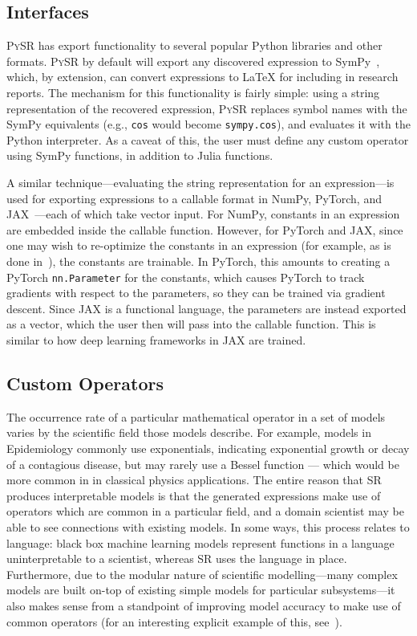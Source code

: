 \documentclass[letterpaper,twocolumn]{scrartcl}
\newcommand\pysr{\textsc{PySR}\xspace}
\begin{document}
\begin{linenumbers}
\subsection{Interfaces}
\label{sec:interfaces}

\pysr has export functionality to several popular Python libraries and other formats.
\pysr by default will export any discovered expression to SymPy~\cite{sympy}, which, by extension, can convert expressions to LaTeX for including in research reports.
The mechanism for this functionality is fairly simple: using a string representation of the recovered expression, \pysr replaces symbol names with the SymPy equivalents (e.g., \texttt{cos} would become \texttt{sympy.cos}),
and evaluates it with the Python interpreter.
As a caveat of this, the user must define any custom operator using SymPy functions, in addition to Julia functions.

A similar technique---evaluating the string representation for an expression---is used for exporting expressions to a callable format in NumPy, PyTorch, and JAX~\cite{numpy,torch,jax}---each of which take vector input.
For NumPy, constants in an expression are embedded inside the callable function.
However, for PyTorch and JAX, since one may wish to re-optimize the constants in an expression (for example, as is done in~\cite{lemosRediscoveringNewtonGravity2022}), the constants are trainable.
In PyTorch, this amounts to creating a PyTorch \texttt{nn.Parameter} for the constants, which causes PyTorch to track gradients with respect to the parameters, so they can be trained via gradient descent.
Since JAX is a functional language, the parameters are instead exported as a vector, which the user then will pass into the callable function.
This is similar to how deep learning frameworks in JAX are trained.

\subsection{Custom Operators}
\label{sec:custom_operators}

The occurrence rate of a particular mathematical operator in a set of models varies by the scientific field those models describe.
For example, models in Epidemiology commonly use exponentials, indicating exponential growth or decay of a contagious disease, but may rarely use a Bessel function — which would be more common in in classical physics applications.
The entire reason that SR produces interpretable models is that the generated expressions make use of operators which are common in a particular field, and a domain scientist may be able to see connections with existing models.
In some ways, this process relates to language: black box machine learning models represent functions in a language uninterpretable to a scientist, whereas SR uses the language in place.
Furthermore, due to the modular nature of scientific modelling---many complex models are built on-top of existing simple models for particular subsystems---it also makes sense from a standpoint of improving model accuracy to make use of common operators (for an interesting explicit example of this, see~\cite{guimeraBayesianMachineScientist2020}).


\end{linenumbers}
\end{document}
